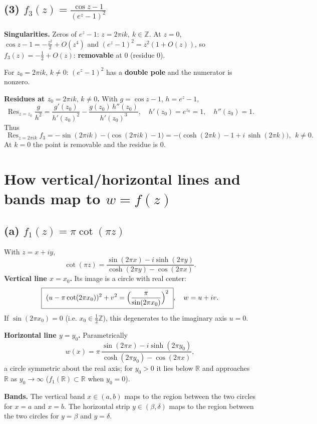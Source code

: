 \documentclass[12pt,a4paper]{article}
\begin{document}
	\bigskip
	
	\subsection*{(3) \(\displaystyle f_3(z)=\frac{\cos z-1}{(e^{z}-1)^2}\)}
	\textbf{Singularities.}
	Zeros of \(e^z-1\): \(z=2\pi i k,\ k\in\mathbb Z\).
	At \(z=0\),
	\(\cos z-1=-\tfrac{z^2}{2}+O(z^4)\) and \((e^z-1)^2=z^2(1+O(z))\),
	so \(f_3(z)=-\tfrac12+O(z)\): \textbf{removable} at \(0\) (residue \(0\)).
	
	For \(z_0=2\pi i k\), \(k\neq0\): \((e^z-1)^2\) has a \textbf{double pole} and the numerator is nonzero.
	
	\textbf{Residues at \(z_0=2\pi i k,\,k\neq0\).}
	With \(g=\cos z-1\), \(h=e^z-1\),
	\[
	\operatorname{Res}_{z=z_0}\frac{g}{h^2}
	=\frac{g'(z_0)}{h'(z_0)^2}-\frac{g(z_0)\,h''(z_0)}{h'(z_0)^3},
	\quad
	h'(z_0)=e^{z_0}=1,\quad h''(z_0)=1.
	\]
	Thus
	\[
	\boxed{\ \operatorname{Res}_{z=2\pi i k} f_3
		= -\sin(2\pi i k)-\bigl(\cos(2\pi i k)-1\bigr)
		= -\bigl(\cosh(2\pi k)-1+i\,\sinh(2\pi k)\bigr),\ \ k\neq0. }
	\]
	At \(k=0\) the point is removable and the residue is \(0\).
	
	\section*{How vertical/horizontal lines and bands map to \(w=f(z)\)}
	
	\subsection*{(a) \(\displaystyle f_1(z)=\pi\cot(\pi z)\)}
	With \(z=x+iy\),
	\[
	\cot(\pi z)=\frac{\sin(2\pi x)-i\sinh(2\pi y)}{\cosh(2\pi y)-\cos(2\pi x)} .
	\]
	\textbf{Vertical line \(x=x_0\).} Its image is a circle with real center:
	\[
	\boxed{\ (u-\pi\cot(2\pi x_0))^{2}+v^{2}=\Bigl(\frac{\pi}{\sin(2\pi x_0)}\Bigr)^{2}\ },\quad w=u+iv.
	\]
	If \(\sin(2\pi x_0)=0\) (i.e. \(x_0\in\tfrac12\mathbb Z\)), this degenerates to the imaginary axis \(u=0\).
	
	\textbf{Horizontal line \(y=y_0\).} Parametrically
	\[
	w(x)=\pi\,\frac{\sin(2\pi x)-i\sinh(2\pi y_0)}{\cosh(2\pi y_0)-\cos(2\pi x)} ,
	\]
	a circle symmetric about the real axis; for \(y_0>0\) it lies below \(\mathbb R\) and approaches \(\mathbb R\) as \(y_0\to\infty\)
	(\(f_1(\mathbb R)\subset\mathbb R\) when \(y_0=0\)).
	
	\textbf{Bands.} The vertical band \(x\in(a,b)\) maps to the region between the two circles for \(x=a\) and \(x=b\).  
	The horizontal strip \(y\in(\beta,\delta)\) maps to the region between the two circles for \(y=\beta\) and \(y=\delta\).
	
\end{document}
